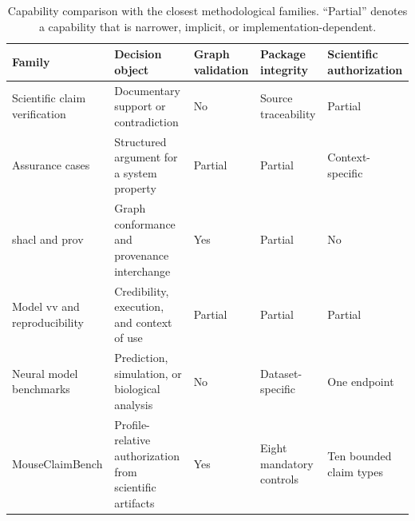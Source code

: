 \begin{table}[!htbp]
\centering
\caption{Capability comparison with the closest methodological families. ``Partial'' denotes a capability that is narrower, implicit, or implementation-dependent.}
\label{tab:related-work-v2}
\scriptsize
\renewcommand{\arraystretch}{1.00}
\begin{tabularx}{\textwidth}{@{}P{0.20\textwidth}P{0.21\textwidth}P{0.12\textwidth}P{0.14\textwidth}Y@{}}
\toprule
Family & Decision object & Graph validation & Package integrity & Scientific authorization \\
\midrule
Scientific claim verification & Documentary support or contradiction & No & Source traceability & Partial \\
Assurance cases & Structured argument for a system property & Partial & Partial & Context-specific \\
\ac{shacl} and \ac{prov} & Graph conformance and provenance interchange & Yes & Partial & No \\
Model \ac{vv} and reproducibility & Credibility, execution, and context of use & Partial & Partial & Partial \\
Neural model benchmarks & Prediction, simulation, or biological analysis & No & Dataset-specific & One endpoint \\
MouseClaimBench & Profile-relative authorization from scientific artifacts & Yes & Eight mandatory controls & Ten bounded claim types \\
\bottomrule
\end{tabularx}
\end{table}
